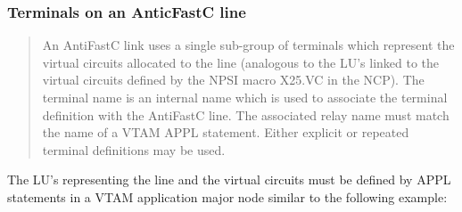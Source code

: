 \documentclass[letterpaper,10pt,english]{sphinxmanual}
\begin{document}
\subsubsection{Terminals on an AnticFastC line}
\label{\detokenize{connectivity_guide:terminals-on-an-anticfastc-line}}\begin{quote}

An AntiFastC link uses a single sub-group of terminals which represent the virtual circuits allocated to the line (analogous to the LU’s linked to the virtual circuits defined by the NPSI macro X25.VC in the NCP). The terminal name is an internal name which is used to associate the terminal definition with the AntiFastC line. The associated relay name must match the name of a VTAM APPL statement. Either explicit or repeated terminal definitions may be used.
\end{quote}


The LU’s representing the line and the virtual circuits must be defined by APPL statements in a VTAM application major node similar to the following example:
\end{document}
